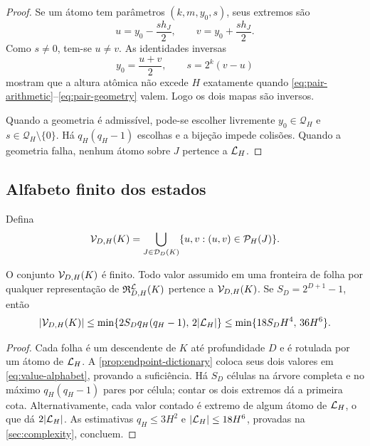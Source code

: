 \begin{proof}
Se um átomo tem parâmetros $(k,m,y_0,s)$, seus extremos são
\[
 u=y_0-\frac{s h_J}{2},\qquad
 v=y_0+\frac{s h_J}{2}.
\]
Como $s\ne0$, tem-se $u\ne v$. As identidades inversas
\[
 y_0=\frac{u+v}{2},\qquad s=2^k(v-u)
\]
mostram que a altura atômica não excede $H$ exatamente quando
\eqref{eq:pair-arithmetic}--\eqref{eq:pair-geometry} valem. Logo os dois
mapas são inversos.

Quando a geometria é admissível, pode-se escolher livremente
$y_0\in\mathcal Q_H$ e $s\in\mathcal Q_H\setminus\{0\}$. Há
$q_H(q_H-1)$ escolhas e a bijeção impede colisões. Quando a geometria falha,
nenhum átomo sobre $J$ pertence a $\mathcal{L}_H$.
\end{proof}

\subsection{Alfabeto finito dos estados}

\begin{definition}
\label{def:value-alphabet}
Defina
\begin{equation}
 \mathcal{V}_{D,H}(K)
 =\bigcup_{J\in\mathcal D_D(K)}
 \{u,v:(u,v)\in\mathcal{P}_H(J)\}.
 \label{eq:value-alphabet}
\end{equation}
\end{definition}

\begin{lemma}
\label{lem:value-alphabet}
O conjunto $\mathcal{V}_{D,H}(K)$ é finito. Todo valor assumido em uma fronteira
de folha por qualquer representação de
$\mathfrak{R}_{D,H}^{\mathcal{L}}(K)$ pertence a
$\mathcal{V}_{D,H}(K)$. Se $S_D=2^{D+1}-1$, então
\begin{equation}
 |\mathcal{V}_{D,H}(K)|
 \le \min\{2S_Dq_H(q_H-1),\,2|\mathcal{L}_H|\}
 \le \min\{18S_DH^4,\,36H^6\}.
 \label{eq:value-alphabet-bound}
\end{equation}
\end{lemma}

\begin{proof}
Cada folha é um descendente de $K$ até profundidade $D$ e é rotulada por um
átomo de $\mathcal{L}_H$. A \cref{prop:endpoint-dictionary} coloca seus dois
valores em \eqref{eq:value-alphabet}, provando a suficiência. Há $S_D$ células
na árvore completa e no máximo $q_H(q_H-1)$ pares por célula; contar os dois
extremos dá a primeira cota. Alternativamente, cada valor contado é extremo
de algum átomo de $\mathcal{L}_H$, o que dá $2|\mathcal{L}_H|$. As estimativas
$q_H\le3H^2$ e $|\mathcal{L}_H|\le18H^6$, provadas na \cref{sec:complexity},
concluem.
\end{proof}

